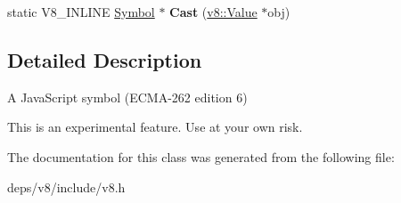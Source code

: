 \begin{DoxyCompactItemize}
\item 
\hypertarget{classv8_1_1_symbol_a6bb214df5e2d8655379a648530aebaf1}{}static V8\+\_\+\+I\+N\+L\+I\+N\+E \hyperlink{classv8_1_1_symbol}{Symbol} $\ast$ {\bfseries Cast} (\hyperlink{classv8_1_1_value}{v8\+::\+Value} $\ast$obj)\label{classv8_1_1_symbol_a6bb214df5e2d8655379a648530aebaf1}

\end{DoxyCompactItemize}


\subsection{Detailed Description}
A Java\+Script symbol (E\+C\+M\+A-\/262 edition 6)

This is an experimental feature. Use at your own risk. 

The documentation for this class was generated from the following file\+:\begin{DoxyCompactItemize}
\item 
deps/v8/include/v8.\+h\end{DoxyCompactItemize}
